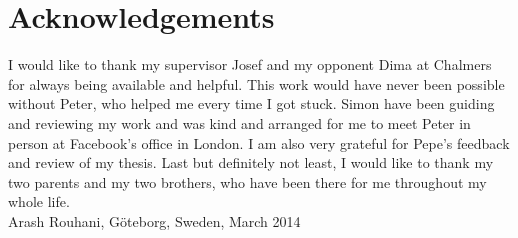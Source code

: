 \newpage
\clearpage
\mbox{}
\newpage
\clearpage
\thispagestyle{empty}
\section*{Acknowledgements}

I would like to thank my supervisor Josef and my opponent Dima at
Chalmers for always being available and helpful. This work would have
never been possible without Peter, who helped me every time I got stuck.
Simon have been guiding and reviewing my work and was kind and arranged
for me to meet Peter in person at Facebook's office in London. I am also
very grateful for Pepe's feedback and review of my thesis. Last but
definitely not least, I would like to thank my two parents and my two
brothers, who have been there for me throughout my whole life. \\[1cm]

\hfill Arash Rouhani, Göteborg, Sweden, March 2014

\newpage
\clearpage
\mbox{}
